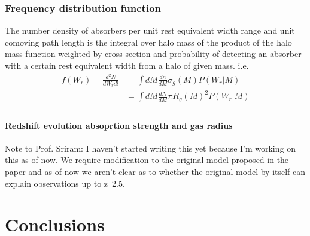 \documentclass[12pt,a4paper,twoside]{book}
\begin{document}
	 	\subsection{Frequency distribution function}
		 	The number density of absorbers per unit rest equivalent width range and unit comoving path length is the integral over halo mass of the product of the halo mass function weighted by cross-section and probability of detecting an absorber with a certain rest equivalent width from a halo of given mass. i.e.
		 	\begin{equation}
		 	\begin{aligned}
			 	f(W_r)=\frac{d^2N}{dW_rdl}&=\int dM\frac{dn}{dM}\sigma_g(M)P(W_r|M)\\
			 	&=\int dM\frac{dN}{dM}\pi R_g(M)^2P(W_r|M)\\
		 	\end{aligned}
		 	\end{equation}
		 	\subsubsection{Redshift evolution absoprtion strength and gas radius}
		 	Note to Prof. Sriram: I haven't started writing this yet because I'm working on this as of now. We require modification to the original model proposed in the paper and as of now we aren't clear as to whether the original model by itself can explain observations up to z~2.5.
 	\chapter{Conclusions}
	 	
			 	
\end{document}
